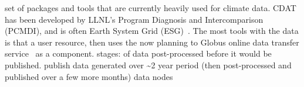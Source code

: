 \documentclass[times]{cpeauth}
\begin{document}
%
%
set of packages and tools that are currently heavily used for %
climate data.  CDAT has been developed by LLNL's Program %
Diagnosis and Intercomparison (PCMDI), and is often %
Earth System Grid (ESG)~\cite{ESG}.  The most %
tools with the data is that a user %
resource, then uses the %
now planning to %
Globus online data transfer service~\cite{globusOnline} as a %
component.
%
%
stages:
%
%
of data
post-processed before it would be published.
publish data generated over \~{}2 year period (then post-processed and published
over a few more months)
%
%
%
%
data nodes
\end{document}
